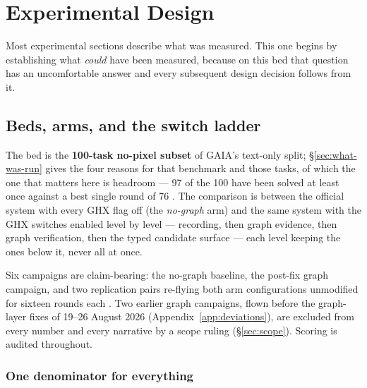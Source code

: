\chapter{Experimental Design}
\label{ch:design}


Most experimental sections describe what was measured. This one begins by
establishing what \emph{could} have been measured, because on this bed that
question has an uncomfortable answer and every subsequent design decision
follows from it.

\section{Beds, arms, and the switch ladder}
\label{sec:beds}

The bed is the \textbf{100-task no-pixel subset} of GAIA's text-only
split; \S\ref{sec:what-was-run} gives the four reasons for that benchmark
and those tasks, of which the one that matters here is headroom --- 97 of
the 100 have been solved at least once against a best single round of 76
. The comparison is
between the official system with every GHX flag off (the \emph{no-graph}
arm) and the same system with the GHX switches enabled level by level ---
recording, then graph evidence, then graph verification, then the typed
candidate surface --- each level keeping the ones below it, never all at
once.

Six campaigns are claim-bearing: the no-graph baseline, the post-fix graph
campaign, and two replication pairs re-flying both arm configurations
unmodified for sixteen rounds each . Two earlier graph
campaigns, flown before the graph-layer fixes of 19--26 August 2026
(Appendix~\ref{app:deviations}), are excluded from every number and every
narrative by a scope ruling (\S\ref{sec:scope}).
Scoring is audited throughout.

\subsection*{One denominator for everything}

